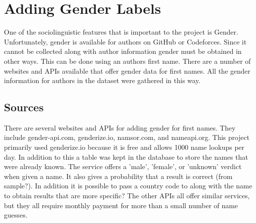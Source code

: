 \documentclass{article}
\begin{document}
\section{Adding Gender Labels}
One of the sociolinguistic features that is important to the project is Gender. Unfortunately, gender is available for authors on GitHub or Codeforces. Since it cannot be collected along with author information gender must be obtained in other ways. This can be done using an authors first name. There are a number of websites and APIs available that offer gender data for first names. All the gender information for authors in the dataset were gathered in this way.

\subsection{Sources}
There are several websites and APIs for adding gender for first names. They include gender-api.com, genderize.io, namsor.com, and nameapi.org. This project primarily used genderize.io because it is free and allows 1000 name lookups per day. In addition to this a table was kept in the database to store the names that were already known. The service offers a 'male', 'female', or 'unknown' verdict when given a name. It also gives a probability that a result is correct (from sample?). In addition it is possible to pass a country code to along with the name to obtain results that are more specific? The other APIs all offer similar services, but they all require monthly payment for more than a small number of name guesses.

\end{document}
